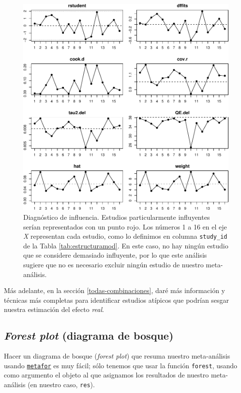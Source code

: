 \documentclass[
  bookmarksnumbered]{article}
\begin{document}
\begin{figure}
\centering
\includegraphics{Meta-analysis_files/figure-latex/infplot-1.pdf}
\caption{\label{fig:infplot}Diagnóstico de influencia. Estudios particularmente influyentes serían representados con un punto rojo. Los números 1 a 16 en el eje \emph{X} representan cada estudio, como lo definimos en columna \texttt{study\_id} de la Tabla \ref{tab:estructuramod}. En este caso, no hay ningún estudio que se considere demasiado influyente, por lo que este análisis sugiere que no es necesario excluir ningún estudio de nuestro meta-análisis.}
\end{figure}

Más adelante, en la sección \ref{todas-combinaciones}, daré más información y técnicas más completas para identificar estudios atípicos que podrían sesgar nuestra estimación del efecto \emph{real}.

\hypertarget{forest-inf}{%
\subsection{\texorpdfstring{\emph{Forest plot} (diagrama de bosque)}{Forest plot (diagrama de bosque)}}\label{forest-inf}}

Hacer un diagrama de bosque (\emph{forest plot}) que resuma nuestro meta-análisis usando \href{https://www.metafor-project.org/doku.php}{\texttt{metafor}} es muy fácil; sólo tenemos que usar la función \texttt{forest}, usando como argumento el objeto al que asignamos los resultados de nuestro meta-análisis (en nuestro caso, \texttt{res}).
\end{document}
